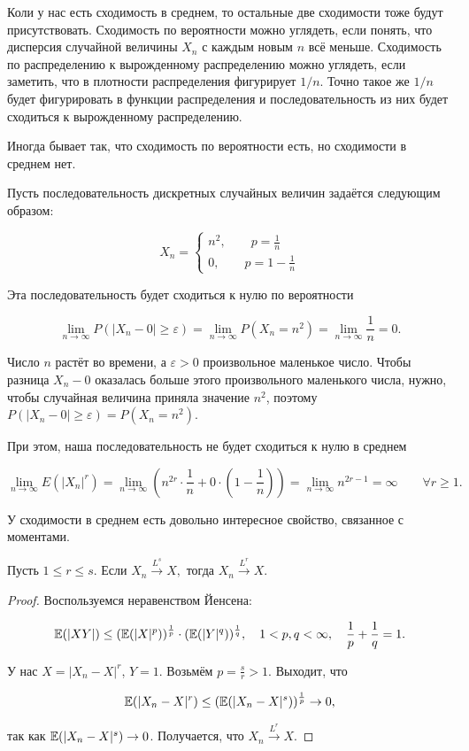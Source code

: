 \documentclass[12pt, a4paper, oneside]{article}
\begin{document}
Коли у нас есть сходимость в среднем, то остальные две сходимости тоже будут присутствовать. Сходимость по вероятности можно углядеть, если понять, что дисперсия случайной величины $X_n$ с каждым новым $n$ всё меньше. Сходимость по распределению к вырожденному распределению можно углядеть, если заметить, что в плотности распределения фигурирует $1/n$. Точно такое же $1/n$ будет фигурировать в функции распределения и последовательность из них будет сходиться к вырожденному распределению.

 Иногда бывает так, что сходимость по вероятности есть, но сходимости в среднем нет. 

Пусть последовательность дискретных случайных величин задаётся следующим образом: 

$$
X_n = \begin{cases} n^2, \qquad p = \frac{1}{n} \\ 0, \qquad p = 1 - \frac{1}{n} \end{cases} 
$$

Эта последовательность будет сходиться к нулю по вероятности

$$
\lim_{n \to \infty} P(|X_n - 0| \ge \varepsilon) = \lim_{n \to \infty} P(X_n = n^2) = \lim_{n \to \infty} \frac{1}{n} = 0.
$$

Число $n$ растёт во времени, а $\varepsilon > 0$ произвольное маленькое число. Чтобы разница $X_n - 0$ оказалась больше этого произвольного маленького числа, нужно, чтобы случайная величина приняла значение $n^2$, поэтому $P(|X_n - 0| \ge \varepsilon) = P(X_n = n^2)$.  

При этом, наша последовательность не будет сходиться к нулю в среднем

$$
\lim_{n \to \infty} E(|X_n|^r) = \lim_{n \to \infty} (n^{2r} \cdot \frac{1}{n} + 0 \cdot (1- \frac{1}{n})) = \lim_{n \to \infty} n^{2r - 1} = \infty \qquad \forall r \ge 1.
$$

У сходимости в среднем есть довольно интересное свойство, связанное с моментами.

\begin{proposition}
Пусть $1 \le r \le s$. Если $X_n \overset{L^s}{\to} X,$ тогда $X_n \overset{L^r}{\to} X$.
\end{proposition}

\begin{proof}
Воспользуемся неравенством Йенсена: 

\[
\mathbb{E}(|XY|) \le (\mathbb{E}(|X|^p))^{\frac{1}{p}} \cdot (\mathbb{E}(|Y|^q))^{\frac{1}{q}}, \quad 1 < p,q < \infty, \quad \frac{1}{p} + \frac{1}{q} = 1.
\]

У нас $X =|X_n - X|^r$, $Y = 1$. Возьмём $p = \frac{s}{r} > 1$. Выходит, что 

\[
\mathbb{E}(|X_n - X|^r) \le (\mathbb{E}(|X_n -X|^s))^{\frac{1}{p}} \to 0,
\]

так как $\mathbb{E}(|X_n -X|^s) \to 0$. Получается, что $X_n \overset{L^r}{\to} X$.
\end{proof}
\end{document}
